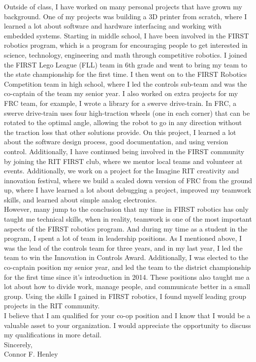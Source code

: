 \documentclass[line,margin]{res}
\begin{document}
\begin{resume}
\begin{adjustwidth}{-92pt}{0pt}
\noindent
Outside of class, I have worked on many personal projects that have grown my background. One of my projects was building a 3D printer from scratch, where I learned a lot about software and hardware interfacing and working with embedded systems. Starting in middle school, I have been involved in the FIRST robotics program, which is a program for encouraging people to get interested in science, technology, engineering and math through competitive robotics. I joined the FIRST Lego League (FLL) team in 6th grade and went to bring my team to the state championship for the first time. I then went on to the FIRST Robotics Competition team in high school, where I led the controls sub-team and was the co-captain of the team my senior year. I also worked on extra projects for my FRC team, for example, I wrote a library for a swerve drive-train. In FRC, a swerve drive-train uses four high-traction wheels (one in each corner) that can be rotated to the optimal angle, allowing the robot to go in any direction without the traction loss that other solutions provide. On this project, I learned a lot about the software design process, good documentation, and using version control. Additionally, I have continued being involved in the FIRST community by joining the RIT FIRST club, where we mentor local teams and volunteer at events. Additionally, we work on a project for the Imagine RIT creativity and innovation festival, where we build a scaled down version of FRC from the ground up, where I have learned a lot about debugging a project, improved my teamwork skills, and learned about simple analog electronics. \\

\noindent
However, many jump to the conclusion that my time in FIRST robotics has only taught me technical skills, when in reality, teamwork is one of the most important aspects of the FIRST robotics program. And during my time as a student in the program, I spent a lot of team in leadership positions. As I mentioned above, I was the lead of the controls team for three years, and in my last year, I led the team to win the Innovation in Controls Award. Additionally, I was elected to the co-captain position my senior year, and led the team to the district championship for the first time since it's introduction in 2014. These positions also taught me a lot about how to divide work, manage people, and communicate better in a small group. Using the skills I gained in FIRST robotics, I found myself leading group projects in the RIT community. \\

\noindent
I believe that I am qualified for your co-op position and I know that I would be a valuable asset to your organization. I would appreciate the opportunity to discuss my qualifications in more detail. \\

Sincerely, \\
Connor F. Henley

\end{adjustwidth}
\end{resume}
\end{document}
